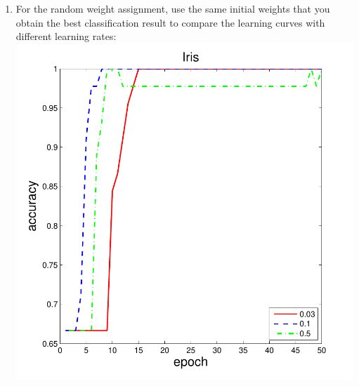 \documentclass[12pt,a4paper]{article}
\begin{document}
\begin{CJK}{UTF8}{bsmi}
\begin{enumerate}
\begin{enumerate}
\item For the random weight assignment, use the same initial weights that you obtain the best classification result to compare the learning curves with different learning rates:
\\
\includegraphics[scale=0.7]{iriscurve}


\end{enumerate}
\end{enumerate}
\end{CJK}
\end{document}
